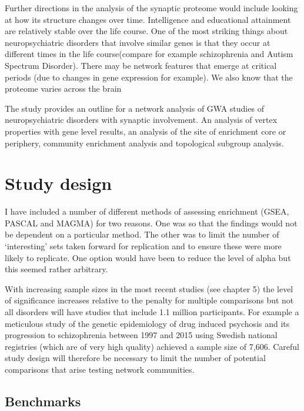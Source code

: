 Further directions in the analysis of the synaptic proteome would include looking at how its structure changes over time. Intelligence and educational attainment are relatively stable over the life course. One of the most striking things about neuropsychiatric disorders  that involve similar genes is that they occur at different times in the life course(compare for example schizophrenia and Autism Spectrum Disorder). There may be network features that emerge at critical periods (due to changes in gene expression for example).   We also know that the proteome varies across the brain\cite{grant2019synapse}








The study provides an outline for a network analysis of GWA studies of neuropsychiatric disorders with synaptic involvement. An analysis of vertex properties with gene level results, an analysis of the site of enrichment core or periphery, community enrichment analysis and topological subgroup analysis. 

\section{Study design}
\label{sec:study design discussion}
I have included a number of different methods of assessing enrichment (GSEA, PASCAL and MAGMA) for two reasons. One was so that the findings would not be dependent on a particular method. The other was to limit the number of `interesting' sets taken forward for replication and to ensure these were more likely to replicate. One option would have been to reduce the level of alpha but this seemed rather arbitrary. 

With increasing sample sizes in the most recent studies (see chapter 5) the level of significance increases relative to the penalty for multiple comparisons but not all disorders will have studies that include 1.1 million participants. For example a meticulous study of the genetic epidemiology of drug induced psychosis and its progression to schizophrenia between 1997 and 2015 using Swedish national registries (which are of very high quality) achieved a sample size of 7,606\cite{kendler2019prediction}. Careful study design will therefore be necessary to limit the number of potential comparisons that arise testing network communities. 




 
 
 \subsection{Benchmarks}
 

